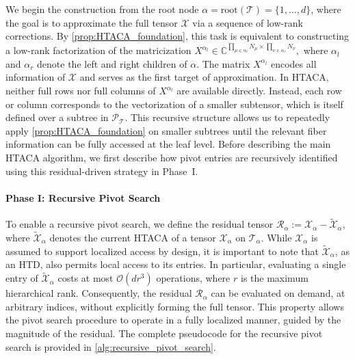 \documentclass{article}
\theoremstyle{plain}
\theoremstyle{definition}
\theoremstyle{remark}
\begin{document}
We begin the construction from the root node \(\alpha = \text{root}(\mathcal{T}) = \{1,\dots,d\}\), where the goal is to approximate the full tensor \(\mathcal{X}\) via a sequence of low-rank corrections. By \cref{prop:HTACA_foundation}, this task is equivalent to constructing a low-rank factorization of the matricization \(X^{\alpha_l} \in \mathbb{C}^{\prod_{\mu \in \alpha_l} N_\mu \times \prod_{\nu \in \alpha_r} N_\nu},\)
where \(\alpha_l\) and \(\alpha_r\) denote the left and right children of \(\alpha\). The matrix \(X^{\alpha_l}\) encodes all information of $\mathcal{X}$ and serves as the first target of approximation. In HTACA, neither full rows nor full columns of \(X^{\alpha_l}\) are available directly. Instead, each row or column corresponds to the vectorization of a smaller subtensor, which is itself defined over a subtree in \( \mathcal{P}_\mathcal{T}\). This recursive structure allows us to repeatedly apply \cref{prop:HTACA_foundation} on smaller subtrees until the relevant fiber information can be fully accessed at the leaf level. Before describing the main HTACA algorithm, we first describe how pivot entries are recursively identified using this residual-driven strategy in Phase~I.

\paragraph{Phase I: Recursive Pivot Search}  
To enable a recursive pivot search, we define the residual tensor \(\mathcal{R}_\alpha := \mathcal{X}_\alpha - \widetilde{\mathcal{X}}_\alpha\), where \(\widetilde{\mathcal{X}}_\alpha\) denotes the current HTACA of a tensor $\mathcal{X}_\alpha$ on $\mathcal{T}_\alpha$. While \(\mathcal{X}_\alpha\) is assumed to support localized access by design, it is important to note that \(\widetilde{\mathcal{X}}_\alpha\), as an HTD, also permits local access to its entries. In particular, evaluating a single entry of \(\widetilde{\mathcal{X}}_\alpha\) costs at most \(\mathcal{O}(dr^3)\) operations, where \(r\) is the maximum hierarchical rank. Consequently, the residual \(\mathcal{R}_\alpha\) can be evaluated on demand, at arbitrary indices, without explicitly forming the full tensor. This property allows the pivot search procedure to operate in a fully localized manner, guided by the magnitude of the residual. The complete pseudocode for the recursive pivot search is provided in \cref{alg:recursive_pivot_search}.
\end{document}
